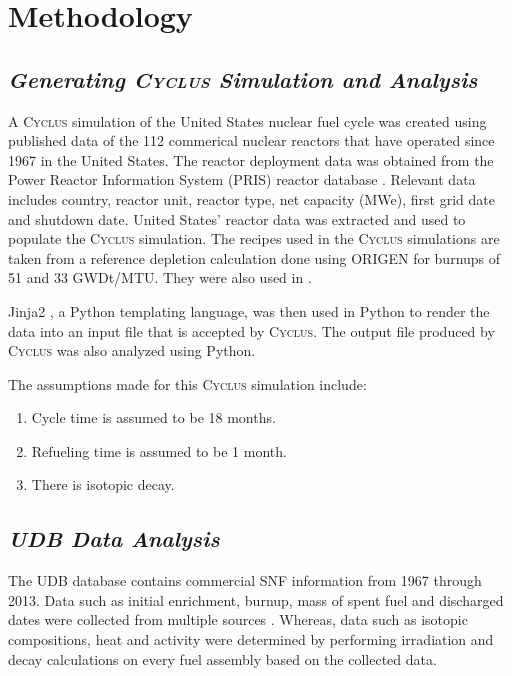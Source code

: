 \documentclass{anstrans}
\newcommand{\Cyclus}{\textsc{Cyclus}\xspace}%
\begin{document}
\section{Methodology}
\subsection{\textit{Generating \Cyclus Simulation and Analysis}}
A \Cyclus simulation of the United States nuclear fuel cycle was created using 
published data of the 112 commerical nuclear reactors that have operated since 
1967 in the United States. The reactor deployment data was obtained from the 
Power Reactor Information System (PRIS) reactor database \cite{IAEA_pris_2017}. 
Relevant data includes country, reactor unit, reactor type, net capacity (MWe), 
first grid date and shutdown date. United States' reactor data was extracted 
and used to populate the \Cyclus simulation. The recipes used in the \Cyclus 
simulations are taken from a reference depletion calculation done using ORIGEN 
\cite{bell_origen_1973} for burnups of 51 and 33 GWDt/MTU. They were also used 
in \cite{wilson_adoption_2009, bae_synergistic_2017}. 

Jinja2 \cite{ronacher_welcome_2018}, a Python templating language, was then 
used in Python to render the data into an input file that is accepted by 
\Cyclus. The output file produced by \Cyclus was also analyzed using Python. 

The assumptions made for this \Cyclus simulation include: 

\begin{enumerate}
	\item Cycle time is assumed to be 18 months. 
	\item Refueling time is assumed to be 1 month. 
	\item There is isotopic decay. 
\end{enumerate}

\subsection{\textit{UDB Data Analysis}}
The UDB database contains commercial SNF information from 1967 through 2013. 
Data such as initial enrichment, burnup, mass of spent fuel and discharged 
dates were collected from multiple sources \cite{peterson_additional_2017}. 
Whereas, data such as isotopic compositions, heat and activity were determined 
by performing irradiation and decay calculations on every fuel assembly based 
on the collected data. 
\end{document}
